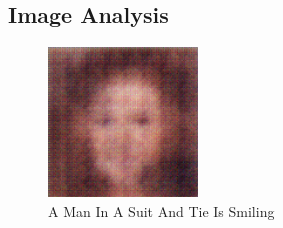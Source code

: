 \documentclass{article}%
\begin{document}
%
\subsection{Image Analysis}%
\label{subsec:ImageAnalysis}%


\begin{figure}[h!]%
\centering%
\includegraphics[width=150px]{500_fake_images/samples_5_376.png}%
\caption{A Man In A Suit And Tie Is Smiling}%
\end{figure}

%
\end{document}
